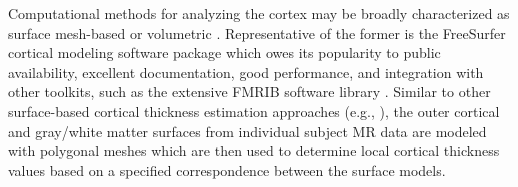 
Computational methods for analyzing the cortex may be 
broadly characterized as surface mesh-based or volumetric \citep{scott2009,clarkson2011}.  Representative of the former is the
FreeSurfer
%
cortical modeling software package \citep{dale1999,fischl1999,fischl2000,fischl2002,fischl2004}
which owes its popularity to public availability, excellent documentation, 
good performance, and integration with other toolkits, such as the extensive FMRIB software 
library \citep{smith2004}.  Similar to other surface-based cortical thickness estimation
approaches (e.g., \cite{davatzikos1996,magnotta1999,macdonald2000,kim2005}), the outer cortical
and gray/white matter surfaces from individual subject MR data are modeled with polygonal meshes
which are then used to determine local cortical thickness values based on a specified correspondence between 
the surface models.

